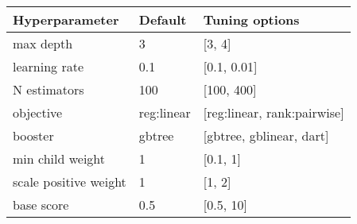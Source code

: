 
\begin{tabular}{|l|l|l|} 
\hline
\textbf{Hyperparameter}& \textbf{Default} & \textbf{Tuning options}\\
\hline
max depth & 3 & [3, 4]\\
\hline
learning rate & 0.1 & [0.1, 0.01] \\
\hline
N estimators & 100 & [100, 400] \\
\hline
objective & reg:linear & [reg:linear, rank:pairwise] \\
\hline
booster & gbtree & [gbtree, gblinear, dart] \\
\hline
min child weight & 1 & [0.1, 1] \\
\hline
scale positive weight & 1& [1, 2] \\
\hline
base score & 0.5 & [0.5, 10] \\
\hline
\end{tabular}
